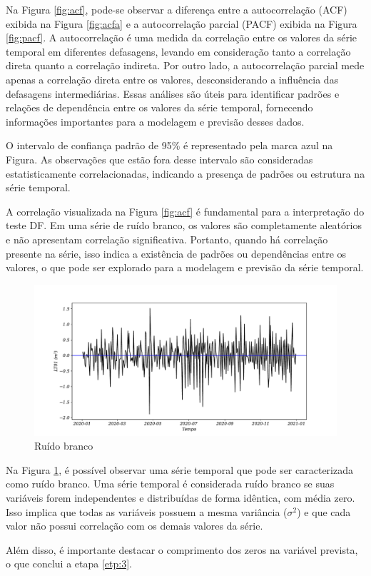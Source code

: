 Na Figura \ref{fig:acf}, pode-se observar a diferença entre a autocorrelação (ACF) exibida na Figura \ref{fig:acfa} e a autocorrelação parcial (PACF) exibida na Figura \ref{fig:pacf}. A autocorrelação é uma medida da correlação entre os valores da série temporal em diferentes defasagens, levando em consideração tanto a correlação direta quanto a correlação indireta. Por outro lado, a autocorrelação parcial mede apenas a correlação direta entre os valores, desconsiderando a influência das defasagens intermediárias. Essas análises são úteis para identificar padrões e relações de dependência entre os valores da série temporal, fornecendo informações importantes para a modelagem e previsão desses dados.

O intervalo de confiança padrão de 95\% é representado pela marca azul na Figura. As observações que estão fora desse intervalo são consideradas estatisticamente correlacionadas, indicando a presença de padrões ou estrutura na série temporal.

A correlação visualizada na Figura \ref{fig:acf} é fundamental para a interpretação do teste DF. Em uma série de ruído branco, os valores são completamente aleatórios e não apresentam correlação significativa. Portanto, quando há correlação presente na série, isso indica a existência de padrões ou dependências entre os valores, o que pode ser explorado para a modelagem e previsão da série temporal.

\begin{figure}[!htpb]
	\centering
	\caption{Ruído branco}
	\label{fig:ruido-branco}
	\includegraphics[width=0.9\linewidth]{Resultados/Figuras/ruido-branco}
	
\end{figure}

Na Figura \ref{fig:ruido-branco}, é possível observar uma série temporal que pode ser caracterizada como ruído branco. Uma série temporal é considerada ruído branco se suas variáveis forem independentes e distribuídas de forma idêntica, com média zero. Isso implica que todas as variáveis possuem a mesma variância ($\sigma^2$) e que cada valor não possui correlação com os demais valores da série.

Além disso, é importante destacar o comprimento dos zeros na variável prevista, o que conclui a etapa \ref{etp:3}.